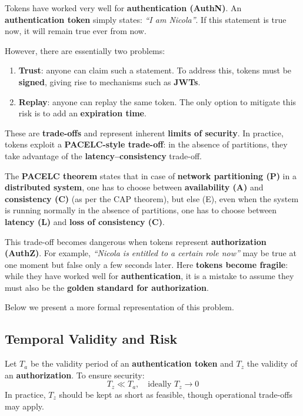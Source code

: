 Tokens have worked very well for \textbf{authentication (AuthN)}.  
An \textbf{authentication token} simply states: \emph{``I am Nicola''}.  
If this statement is true now, it will remain true ever from now.  

However, there are essentially two problems:
\begin{enumerate}
    \item \textbf{Trust}: anyone can claim such a statement.  
    To address this, tokens must be \textbf{signed}, giving rise to mechanisms such as \textbf{JWTs}.
    \item \textbf{Replay}: anyone can replay the same token.  
    The only option to mitigate this risk is to add an \textbf{expiration time}.
\end{enumerate}

These are \textbf{trade-offs} and represent inherent \textbf{limits of security}.  
In practice, tokens exploit a \textbf{PACELC-style trade-off}: in the absence of partitions, they take advantage of the \textbf{latency–consistency} trade-off.  

\begin{boxF}
    The \textbf{PACELC theorem} \cite{c9} states that in case of \textbf{network partitioning (P)} in a \textbf{distributed system}, one has to choose between \textbf{availability (A)} and \textbf{consistency (C)} (as per the CAP theorem), but else (E), even when the system is running normally in the absence of partitions, one has to choose between \textbf{latency (L)} and \textbf{loss of consistency (C)}.
\end{boxF}

This trade-off becomes dangerous when tokens represent \textbf{authorization (AuthZ)}.  
For example, \emph{``Nicola is entitled to a certain role now''} may be true at one moment 
but false only a few seconds later.  
Here \textbf{tokens become fragile}: while they have worked well for \textbf{authentication}, 
it is a mistake to assume they must also be the \textbf{golden standard for authorization}.  

Below we present a more formal representation of this problem.

\subsection{Temporal Validity and Risk}
Let $T_a$ be the validity period of an \textbf{authentication token} and $T_z$ the validity of an \textbf{authorization}.  
To ensure security:
\[
T_z \ll T_a, \quad \text{ideally } T_z \to 0
\]
In practice, $T_z$ should be kept as short as feasible, though operational trade-offs may apply.  

